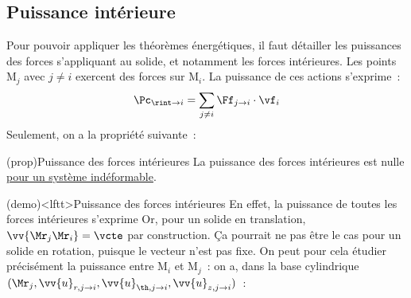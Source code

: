 \documentclass[../../main/main.tex]{subfiles}
\begin{document}
\subsection{Puissance intérieure}
Pour pouvoir appliquer les théorèmes énergétiques, il faut détailler les
puissances des forces s'appliquant au solide, et notamment les forces
intérieures. Les points M$_j$ avec $j\neq i$ exercent des forces sur M$_i$. La
puissance de ces actions s'exprime~:
\[\Pc_{\rint\to i} = \sum_{j\neq i} \Ff_{j\to i}\cdot\vf_i\]
Seulement, on a la propriété suivante~:
\begin{tcb*}(prop){Puissance des forces intérieures}
			La puissance des forces intérieures est nulle \ul{pour un système
				indéformable}.
\end{tcb*}
\begin{tcb*}(demo)<lftt>{Puissance des forces intérieures}
	En effet, la puissance de toutes les forces intérieures s'exprime
  \psw{
      \[
      \Pc_{\rint} =
      \sum_i\Pc_{\rint\to i} =
      \sum_i\sum_{j\neq i}\Ff_{j\to i}\cdot \vf_i =
      \sum_i\sum_{j\neq i}\Ff_{j\to i}\cdot \dv{\vv{\Mr_j\Mr_i}}{t}
    \]
  }%
  Or, pour un solide en translation, $\vv{\Mr_j\Mr_i} = \vcte$ par construction.
  Ça pourrait ne pas être le cas pour un solide en rotation, puisque le vecteur
  n'est pas fixe. On peut pour cela étudier précisément la puissance entre
  M$_i$ et M$_j$~: on a, dans la base cylindrique $(\Mr_j, \vv{u}_{r,j\to i},
  \vv{u}_{\th,j\to i}, \vv{u}_{z,j\to i})$~:
\end{tcb*}
\end{document}
